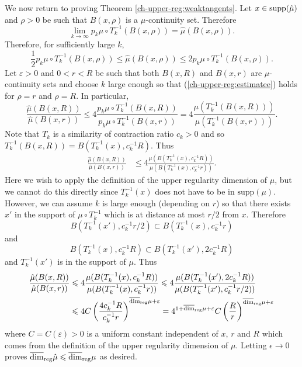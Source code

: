 We now return to proving Theorem \ref{ch-upper-reg:weaktangents}. Let  $x \in \textup{supp}( \hat \mu)$ and $\rho>0$ be such that $B(x,\rho)$ is a $\hat \mu$-continuity set.   Therefore 
\[
\lim_{k\rightarrow \infty} p_k \mu \circ T^{-1}_k (B(x,\rho)) =\hat{\mu}(B(x,\rho)).
\]
Therefore, for sufficiently large $k$, 
\begin{equation} \label{ch-upper-reg:estimatee}
\frac{1}{2}p_k \mu \circ T^{-1}_k (B(x,\rho))  \le \hat{\mu}(B(x,\rho))\le 2p_k \mu \circ T^{-1}_k (B(x,\rho)).
\end{equation}
Let $\varepsilon > 0 $ and  $0<r<R$ be such that both $B(x,R)$ and $B(x,r)$ are $\hat \mu$-continuity sets  and  choose $k $ large enough so that  (\ref{ch-upper-reg:estimatee}) holds for $\rho=r$ and $\rho=R$.  In particular,  
\[
\frac{\hat{\mu}(B(x,R))}{\hat{\mu}(B(x,r))} \le 4 \frac{p_k\mu \circ T^{-1}_k (B(x,R))}{p_k \mu \circ T^{-1}_k (B(x,r))}=4\frac{\mu (T^{-1}_k (B(x,R)))}{\mu( T^{-1}_k (B(x,r)))}.
\]
Note that $T_k$ is a similarity of contraction ratio $c_k >0$ and so $T_k^{-1}(B(x,R))= B(T_k^{-1}(x),c_k^{-1}R)$. Thus
\begin{align*}
\frac{\hat{\mu}(B(x,R))}{\hat{\mu}(B(x,r))} &\le 4\frac{\mu (B(T_k^{-1}(x),c_k^{-1}R))}{\mu (B(T_k^{-1}(x),c_k^{-1}r))}.
\end{align*}
Here we wish to apply the definition of the upper regularity dimension of $\mu$, but we cannot do this directly since  $T_k^{-1}(x)$ does not have to be in $\text{supp}(\mu)$. However, we can assume $k$ is large enough (depending on $r$) so that there exists $x'$ in the support of $\mu \circ T_k^{-1}$ which is at distance at most $r/2$ from $x$. Therefore
\[
B(T_k^{-1}(x'),c_k^{-1}r/2)\subset B(T_k^{-1}(x),c_k^{-1}r)
\]
and
\[
B(T_k^{-1}(x),c_k^{-1}R) \subset B(T_k^{-1}(x'), 2c_k^{-1}R)
\]
and $T_k^{-1}(x')$ is in the support of $\mu$.  Thus
\begin{align*}
\frac{\hat{\mu}(B(x,R))}{\hat{\mu}(B(x,r))} &\leqslant 4\frac{\mu (B(T_k^{-1}(x),c_k^{-1}R))}{\mu (B(T_k^{-1}(x),c_k^{-1}r))} \leqslant 4\frac{\mu (B(T_k^{-1}(x'),2c_k^{-1}R))}{\mu (B(T_k^{-1}(x'),c_k^{-1}r/2))} \\
&\leqslant 4C \left(\frac{4c_k^{-1}R}{c_k^{-1}r}\right)^{\overline{\dim}_{\textup{reg}} \mu+ \varepsilon} =  4^{1+\overline{\dim}_{\textup{reg}} \mu+ \varepsilon}C \left(\frac{R}{r}\right)^{\overline{\dim}_{\textup{reg}} \mu+ \varepsilon}
\end{align*}
where $C= C(\varepsilon)>0$ is a uniform constant independent of $x$, $r$ and $R$ which comes from the definition of the upper regularity dimension of $\mu$. Letting $\epsilon \to 0$ proves  $\overline{\dim}_{\textup{reg}} \hat{\mu} \leqslant \overline{\dim}_{\textup{reg}} \mu$ as desired.


